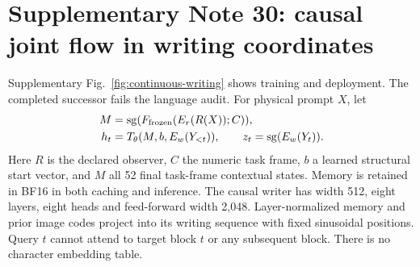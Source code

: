 \documentclass[10pt,a4paper]{article}
\begin{document}

\section*{Supplementary Note 30: causal joint flow in writing coordinates}
Supplementary Fig.~\ref{fig:continuous-writing} shows training and deployment.
The completed successor fails the language audit. For physical prompt $X$, let
\begin{align}
 M &= \operatorname{sg}(F_{\rm frozen}(E_r(R(X));C)),\\
 h_t &= T_\theta(M,b,E_w(Y_{<t})),\qquad z_t=\operatorname{sg}(E_w(Y_t)).
\end{align}
Here $R$ is the declared observer, $C$ the numeric task frame, $b$ a learned
structural start vector, and $M$ all 52 final task-frame contextual states.
Memory is retained in BF16 in both caching and inference. The causal writer
has width 512, eight layers, eight heads and feed-forward width 2,048.
Layer-normalized memory and prior image codes project into its writing
sequence with fixed sinusoidal positions. Query $t$ cannot attend to target
block $t$ or any subsequent block. There is no character embedding table.
\end{document}
